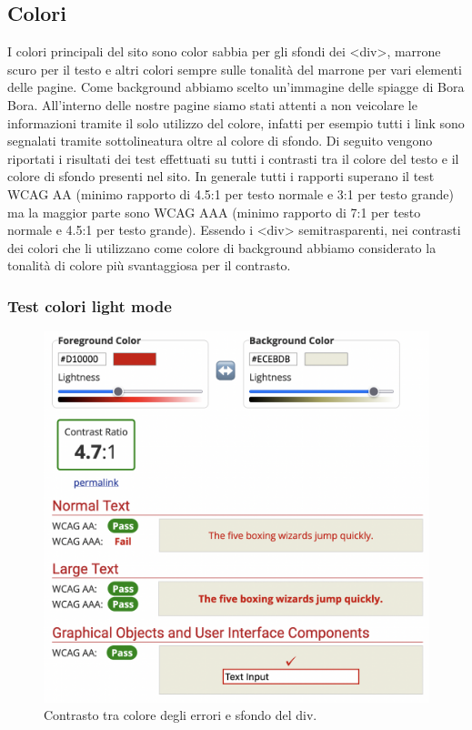\documentclass[a4paper]{article}
\begin{document}
	\subsection{Colori}
	I colori principali del sito sono color sabbia per gli sfondi dei <div>, marrone scuro per il testo e altri colori sempre sulle tonalità del marrone per vari elementi delle pagine. Come background abbiamo scelto un'immagine delle spiagge di Bora Bora. All'interno delle nostre pagine siamo stati attenti a non veicolare le informazioni tramite il solo utilizzo del colore, infatti per esempio tutti i link sono segnalati tramite sottolineatura oltre al colore di sfondo. Di seguito vengono riportati i risultati dei test effettuati su tutti i contrasti tra il colore del testo e il colore di sfondo presenti nel sito. In generale tutti i rapporti superano il test WCAG AA (minimo rapporto di 4.5:1 per testo normale e 3:1 per testo grande) ma la maggior parte sono WCAG AAA (minimo rapporto di 7:1 per testo normale e 4.5:1 per testo grande). Essendo i <div> semitrasparenti, nei contrasti dei colori che li utilizzano come colore di background abbiamo considerato la tonalità di colore più svantaggiosa per il contrasto.


	\subsubsection{Test colori light mode}
	\begin{figure}[H]
		\centering
		\includegraphics[scale=0.3]{immagini/controllo-colori/light-mode/errore_sfondo-div.png}
		\caption{Contrasto tra colore degli errori e sfondo del div.}
	\end{figure}
\end{document}
